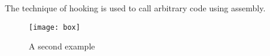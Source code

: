 The technique of hooking is used to call arbitrary code using assembly.


\begin{figure}[ht]
	\centering
	\texttt{[image: box]}
	\caption{A second example}
	\label{fig:exmemmap2}
\end{figure}


